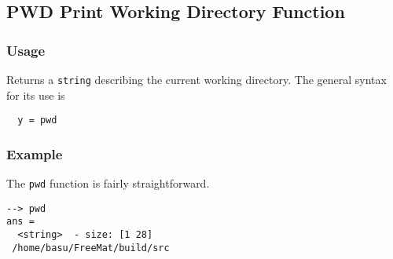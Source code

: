 %
%
%
\subsection{PWD Print Working Directory Function}
\subsubsection{Usage}
Returns a \verb|string| describing the current working directory.  The general syntax for its use is
\begin{verbatim}
  y = pwd
\end{verbatim}

\subsubsection{Example}
The \verb|pwd| function is fairly straightforward.
\begin{verbatim}
--> pwd
ans =
  <string>  - size: [1 28]
 /home/basu/FreeMat/build/src
\end{verbatim}
